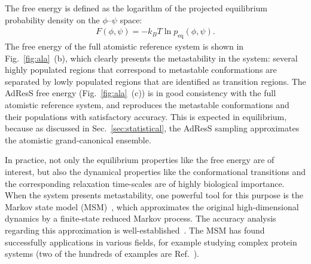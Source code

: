 \documentclass[epjST]{svjour}
\newcommand{\equi}{{\textrm{eq}}}
\begin{document}
The free energy is defined as the logarithm of the projected equilibrium probability density on the
$\phi$--$\psi$ space:
\begin{align}
  F(\phi,\psi) = -k_BT \ln p_\equi(\phi,\psi).
\end{align}
The free energy of the full atomistic reference system is shown in
Fig.~\ref{fig:ala}~(b), which clearly presents the metastability in the
system: several highly populated regions that correspond to metastable
conformations are separated by lowly populated regions that are
identified as transition regions.
The AdResS free energy (Fig.~\ref{fig:ala}~(c)) is in good
consistency with the full atomistic reference system, and
reproduces the metastable conformations and their populations
with satisfactory accuracy.
This is expected in equilibrium, because as discussed in
Sec.~\ref{sec:statistical}, the AdResS sampling approximates the
atomistic grand-canonical ensemble.

In practice, not only the equilibrium properties like the free energy are of interest,
but also the dynamical properties like the conformational transitions and the corresponding relaxation time-scales
are of highly biological importance.
When the system presents metastability,
one powerful tool for this purpose
is the Markov state model (MSM)~\cite{prinz2011probing,prinz2011markov,schuette2011markov}, which
approximates the original high-dimensional dynamics by a finite-state reduced
Markov process.
The accuracy analysis regarding  this approximation is well-established~\cite{sarich2010approximation,djurdjevac2012estimating}.
The MSM has found successfully applications in various fields, for example studying complex protein systems
(two of the hundreds of examples are Ref.~\cite{noe2009constructing,kohlhoff2014cloud}).
\end{document}

